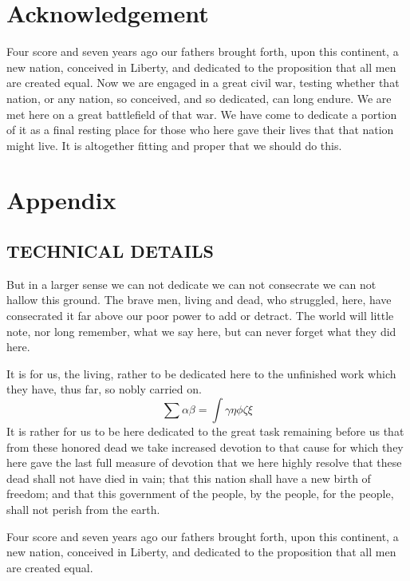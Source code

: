 \documentclass{roffin}
\begin{document}
\section*{Acknowledgement}
Four score and seven years ago our fathers brought forth,
upon this continent, a new nation, conceived in Liberty, and dedicated to
the proposition that all men are created equal.
Now we are engaged in a great civil war, testing whether that nation, or any nation, so conceived, and so dedicated, can long endure.
We are met here on a great battlefield of that war. We have come to dedicate a portion of it as a final resting place for those who
here gave their lives that that nation might live. It is altogether fitting and proper that we should do this.

\appendix
\section*{Appendix}
\subsection*{TECHNICAL DETAILS}

But in a larger sense we can not dedicate we can not consecrate we can not hallow this ground. The brave men, living and dead,
who struggled, here, have consecrated it far above our poor power to add or detract. The world will little note, nor long remember,
what we say here, but can never forget what they did here.

It is for us, the living, rather to be dedicated here to the unfinished work
which they have, thus far, so nobly carried on.
\begin{equation}
\sum\alpha\beta=\int\gamma\eta\phi\zeta\xi
\end{equation}
It is rather for us to be here dedicated to the great task remaining before us that
from these honored dead we take increased devotion to that cause for which they here gave the last full measure of devotion that
we here highly resolve that these dead shall not have died in vain; that this nation shall have a new birth of freedom; and that this
government of the people, by the people, for the people, shall not perish from the earth.

Four score and seven years ago our fathers brought forth,
upon this continent, a new nation, conceived in Liberty, and dedicated to
the proposition that all men are created equal.
\end{document}
